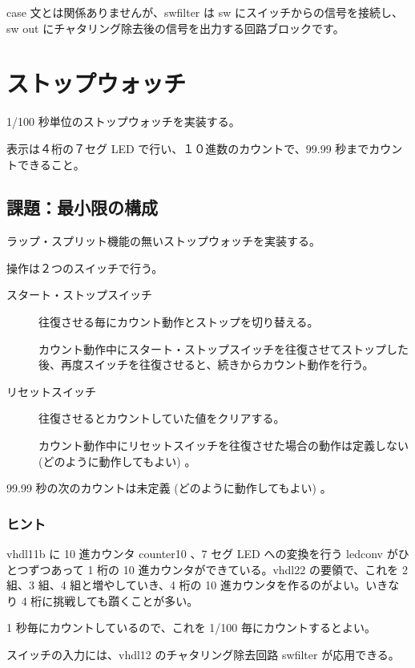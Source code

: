 \documentclass[letterpaper,10pt,dvipdfmx]{sphinxmanual}
\begin{document}
case 文とは関係ありませんが、swfilter は sw にスイッチからの信号を接続し、sw out にチャタリング除去後の信号を出力する回路ブロックです。


\section{ストップウォッチ}
\label{\detokenize{05_try:id30}}
1/100 秒単位のストップウォッチを実装する。

表示は４桁の７セグ LED で行い、１０進数のカウントで、99.99 秒までカウントできること。


\subsection{課題：最小限の構成}
\label{\detokenize{05_try:id31}}
ラップ・スプリット機能の無いストップウォッチを実装する。

操作は２つのスイッチで行う。
\begin{description}
\item[{スタート・ストップスイッチ}] \leavevmode
往復させる毎にカウント動作とストップを切り替える。

カウント動作中にスタート・ストップスイッチを往復させてストップした後、再度スイッチを往復させると、続きからカウント動作を行う。

\item[{リセットスイッチ}] \leavevmode
往復させるとカウントしていた値をクリアする。

カウント動作中にリセットスイッチを往復させた場合の動作は定義しない (どのように動作してもよい) 。

\end{description}

99.99 秒の次のカウントは未定義 (どのように動作してもよい) 。


\subsubsection{ヒント}
\label{\detokenize{05_try:id32}}
vhdl11b に 10 進カウンタ counter10 、7 セグ LED への変換を行う ledconv がひとつずつあって 1 桁の 10 進カウンタができている。vhdl22 の要領で、これを 2 組、3 組、4 組と増やしていき、4 桁の 10 進カウンタを作るのがよい。いきなり 4 桁に挑戦しても躓くことが多い。

1 秒毎にカウントしているので、これを 1/100 毎にカウントするとよい。

スイッチの入力には、vhdl12 のチャタリング除去回路 swfilter が応用できる。
\end{document}
